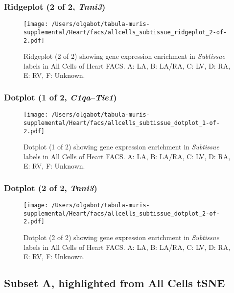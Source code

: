 \clearpage

\subsubsection{Ridgeplot (2 of 2, \emph{Tnni3})}
\begin{figure}[h]
\centering
\texttt{[image: /Users/olgabot/tabula-muris-supplemental/Heart/facs/allcells\_subtissue\_ridgeplot\_2-of-2.pdf]}

\caption{ Ridgeplot (2 of 2)  showing gene expression enrichment in \emph{Subtissue} labels in All Cells of Heart FACS. A: LA, B: LA/RA, C: LV, D: RA, E: RV, F: Unknown.}
\end{figure}


\clearpage

\subsubsection{Dotplot (1 of 2, \emph{C1qa}--\emph{Tie1})}
\begin{figure}[h]
\centering
\texttt{[image: /Users/olgabot/tabula-muris-supplemental/Heart/facs/allcells\_subtissue\_dotplot\_1-of-2.pdf]}

\caption{ Dotplot (1 of 2)  showing gene expression enrichment in \emph{Subtissue} labels in All Cells of Heart FACS. A: LA, B: LA/RA, C: LV, D: RA, E: RV, F: Unknown.}
\end{figure}


\clearpage

\subsubsection{Dotplot (2 of 2, \emph{Tnni3})}
\begin{figure}[h]
\centering
\texttt{[image: /Users/olgabot/tabula-muris-supplemental/Heart/facs/allcells\_subtissue\_dotplot\_2-of-2.pdf]}

\caption{ Dotplot (2 of 2)  showing gene expression enrichment in \emph{Subtissue} labels in All Cells of Heart FACS. A: LA, B: LA/RA, C: LV, D: RA, E: RV, F: Unknown.}
\end{figure}


\clearpage

\subsection{Subset A, highlighted from All Cells tSNE}


